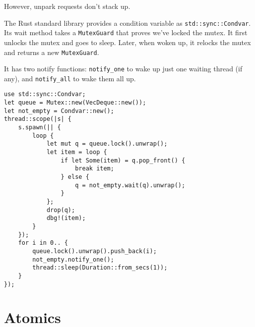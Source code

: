 \documentclass[11pt]{article}
\begin{document}
However, unpark requests don't stack up.

The Rust standard library provides a condition variable as \texttt{std::sync::Condvar}. Its
wait method takes a \texttt{MutexGuard} that proves we’ve locked the mutex. It first unlocks the mutex
and goes to sleep. Later, when woken up, it relocks the mutex and returns a new \texttt{MutexGuard}.

It has two notify functions: \texttt{notify\_one} to wake up just one waiting thread (if any),
and \texttt{notify\_all} to wake them all up.

\begin{verbatim}
use std::sync::Condvar;
let queue = Mutex::new(VecDeque::new());
let not_empty = Condvar::new();
thread::scope(|s| {
    s.spawn(|| {
        loop {
            let mut q = queue.lock().unwrap();
            let item = loop {
                if let Some(item) = q.pop_front() {
                    break item;
                } else {
                    q = not_empty.wait(q).unwrap();
                }
            };
            drop(q);
            dbg!(item);
        }
    });
    for i in 0.. {
        queue.lock().unwrap().push_back(i);
        not_empty.notify_one();
        thread::sleep(Duration::from_secs(1));
    }
});
\end{verbatim}
\section{Atomics}
\label{sec:orgaedb3bc}
\end{document}
